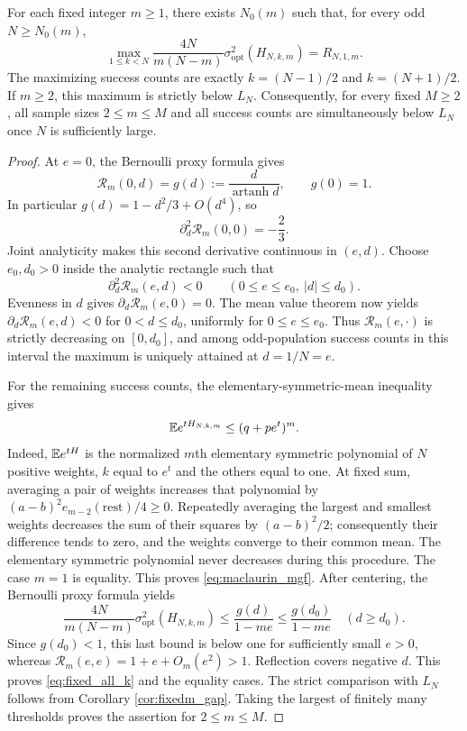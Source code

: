 \begin{theorem}\label{thm:uniform_fixed}
For each fixed integer $m\ge1$, there exists $N_0(m)$ such that, for every odd $N\ge N_0(m)$,
\begin{equation}\label{eq:fixed_all_k}
 \max_{1\le k<N}\frac{4N}{m(N-m)}
 \sigma^2_{\mathrm{opt}}(H_{N,k,m})=R_{N,1,m}.
\end{equation}
The maximizing success counts are exactly $k=(N-1)/2$ and $k=(N+1)/2$. If $m\ge2$, this maximum is strictly below $L_N$. Consequently, for every fixed $M\ge2$, all sample sizes $2\le m\le M$ and all success counts are simultaneously below $L_N$ once $N$ is sufficiently large.
\end{theorem}
\begin{proof}
At $e=0$, the Bernoulli proxy formula gives
\[
 \mathcal R_m(0,d)=g(d):=\frac d{\operatorname{artanh}d},\qquad g(0)=1.
\]
In particular $g(d)=1-d^2/3+O(d^4)$, so
\[
 \partial_d^2\mathcal R_m(0,0)=-\frac23.
\]
Joint analyticity makes this second derivative continuous in $(e,d)$. Choose $e_0,d_0>0$ inside the analytic rectangle such that
\[
 \partial_d^2\mathcal R_m(e,d)<0
 \qquad (0\le e\le e_0,\ |d|\le d_0).
\]
Evenness in $d$ gives $\partial_d\mathcal R_m(e,0)=0$. The mean value theorem now yields $\partial_d\mathcal R_m(e,d)<0$ for $0<d\le d_0$, uniformly for $0\le e\le e_0$. Thus $\mathcal R_m(e,\cdot)$ is strictly decreasing on $[0,d_0]$, and among odd-population success counts in this interval the maximum is uniquely attained at $d=1/N=e$.

For the remaining success counts, the elementary-symmetric-mean inequality gives
\begin{equation}\label{eq:maclaurin_mgf}
 \mathbb E e^{tH_{N,k,m}}\le(q+pe^t)^m.
\end{equation}
Indeed, $\mathbb E e^{tH}$ is the normalized $m$th elementary symmetric polynomial of $N$ positive weights, $k$ equal to $e^t$ and the others equal to one. At fixed sum, averaging a pair of weights increases that polynomial by $(a-b)^2e_{m-2}(\mathrm{rest})/4\ge0$. Repeatedly averaging the largest and smallest weights decreases the sum of their squares by $(a-b)^2/2$; consequently their difference tends to zero, and the weights converge to their common mean. The elementary symmetric polynomial never decreases during this procedure. The case $m=1$ is equality. This proves \eqref{eq:maclaurin_mgf}. After centering, the Bernoulli proxy formula yields
\[
 \frac{4N}{m(N-m)}\sigma^2_{\mathrm{opt}}(H_{N,k,m})
 \le\frac{g(d)}{1-me}\le\frac{g(d_0)}{1-me}\quad(d\ge d_0).
\]
Since $g(d_0)<1$, this last bound is below one for sufficiently small $e>0$, whereas $\mathcal R_m(e,e)=1+e+O_m(e^2)>1$. Reflection covers negative $d$. This proves \eqref{eq:fixed_all_k} and the equality cases. The strict comparison with $L_N$ follows from Corollary \ref{cor:fixedm_gap}. Taking the largest of finitely many thresholds proves the assertion for $2\le m\le M$.
\end{proof}


